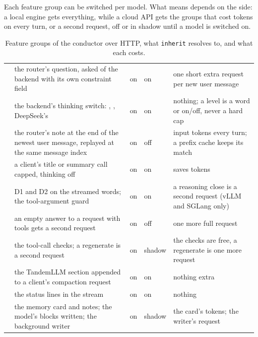 Each feature group can be switched per model. What  means depends on the side: a local engine gets everything, while a cloud API gets the groups that cost tokens on every turn, or a second request, off or in shadow until a model is switched on.

\begin{table}[htbp]
\centering\small
\caption[Feature groups of the conductor over HTTP]{Feature groups of the conductor over HTTP, what \texttt{inherit} resolves to, and what each costs.}\label{tab:feature-groups}
\begin{tabularx}{\linewidth}{@{}L{.13\linewidth}YL{.07\linewidth}L{.07\linewidth}L{.22\linewidth}@{}}
\toprule
{} &  &  &  &  \\
\midrule
{} & the router's question, asked of the backend with its own constraint field & on & on & one short extra request per new user message \\
 & the backend's thinking switch: , , DeepSeek's  & on & on & nothing; a level is a word or on/off, never a hard cap \\
 & the router's note at the end of the newest user message, replayed at the same message index & on & off & input tokens every turn; a prefix cache keeps its match \\
 & a client's title or summary call capped, thinking off & on & on & saves tokens \\
 & D1 and D2 on the streamed words; the tool-argument guard & on & on & a reasoning close is a second request (vLLM and SGLang only) \\
 & an empty answer to a request with tools gets a second request & on & off & one more full request \\
 & the tool-call checks; a regenerate is a second request & on & shadow & the checks are free, a regenerate is one more request \\
 & the TandemLLM section appended to a client's compaction request & on & on & nothing extra \\
 & the status lines in the stream & on & on & nothing \\
 & the memory card and notes; the model's blocks written; the background writer & on & shadow & the card's tokens; the writer's request \\
\bottomrule
\end{tabularx}
\end{table}

